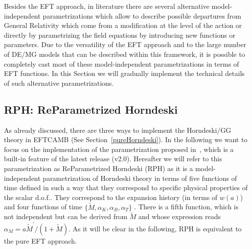 \documentclass[prd,nofootinbib,showpacs]{revtex4}
\begin{document}
{Besides the EFT approach, in  literature there are several alternative model-independent parametrizations which allow to describe possible departures from General Relativity which come from a modification at the level of the action or directly by parametrizing the field equations by introducing new functions or parameters. Due to the versatility of the EFT approach and to the large number of DE/MG models that can be described within this framework, it is possible to completely cast most of these model-independent parametrizations in terms of EFT functions.   In this Section we will gradually implement the technical details of such alternative parametrizations. 

\subsection{RPH: ReParametrized Horndeski}\label{RPH}

As already discussed, there are three ways to implement the Horndeski/GG theory in EFTCAMB (See Section~\ref{pureHorndeski}). In the following we want to focus on the
implementation of the parametrization proposed in~\cite{Bellini:2014fua}, which is a built-in feature of the latest release (v2.0). Hereafter we will refer to this parametrization as ReParametrized Horndeski (RPH) as it is a model-independent parametrization of Horndeski theory in terms  of five functions of time defined in such a way that they  correspond to specific physical properties of the scalar d.o.f.. They correspond to  the expansion history (in terms of $w(a)$) and four functions of time $\{\tilde{M},\alpha_K,\alpha_B,\alpha_T\}$ . There is a fifth function, which is not independent but can  be derived from $\tilde{M}$ and  whose expression reads $\alpha_M= a \tilde{M}^\prime/(1+\tilde{M})$. As it will be clear in the following,  RPH is equivalent to the pure EFT approach.

}
\end{document}
